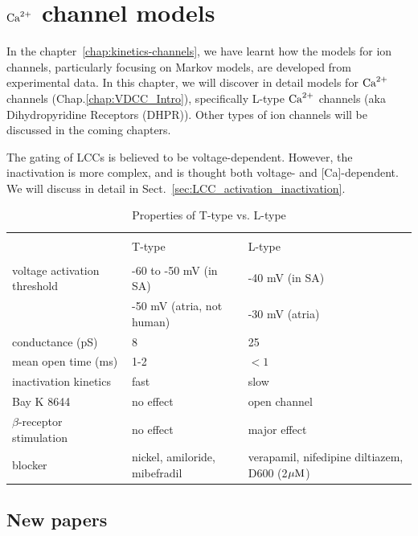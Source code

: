 \chapter{\texorpdfstring{${\text{Ca}^{2+}}$ channel models}{Ca2+ Channel Models}}
\label{chap:dhpr-models}
\label{chap:Ca-channel-models}

In the chapter~\ref{chap:kinetics-channels}, we have learnt how the models for
ion channels, particularly focusing on Markov models, are developed from
experimental data. In this chapter, we will discover in detail models for ${\text{Ca}^{2+}}$
channels (Chap.\ref{chap:VDCC_Intro}), specifically L-type ${\text{Ca}^{2+}}$ channels (aka
Dihydropyridine Receptors (DHPR)).
Other types of ion channels will be discussed in the coming chapters.

The gating of LCCs is believed to be voltage-dependent. However, the
inactivation is more complex, and is thought both voltage- and [Ca]-dependent.
We will discuss in detail in Sect.~\ref{sec:LCC_activation_inactivation}.

 
\begin{table}[hbt]
\begin{center}
\begin{tabular}{p{4cm}|p{3.0cm}p{4cm}}
\hline \\ 
& T-type & L-type \\
\hline \\
voltage activation threshold & -60 to -50 mV (in SA) & -40 mV (in SA) \\
	& -50 mV (atria, not human) & -30 mV (atria) \\
	conductance (pS) & 8 & 25 \\
	mean open time (ms) & 1-2 & $< 1$ \\
	inactivation kinetics & fast & slow \\
	Bay K 8644 & no effect & open channel \\
	$\beta$-receptor  stimulation & no effect & major effect \\
	blocker & nickel, amiloride, mibefradil & verapamil, nifedipine diltiazem, D600 (2${\mu\text{M}}$)\\
	\hline
\end{tabular}
\caption{Properties of T-type vs. L-type \citep{opie2004}}
\end{center}
\end{table}

\section{New papers}

